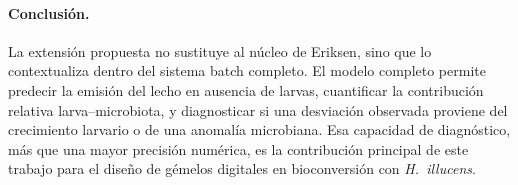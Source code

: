 \paragraph{Conclusi\'{o}n.}
La extensi\'{o}n propuesta no sustituye al n\'{u}cleo de Eriksen, sino
que lo contextualiza dentro del sistema batch completo. El modelo
completo permite predecir la emisi\'{o}n del lecho en ausencia de
larvas, cuantificar la contribuci\'{o}n relativa larva--microbiota, y
diagnosticar si una desviaci\'{o}n observada proviene del crecimiento
larvario o de una anomal\'{i}a microbiana. Esa capacidad de
diagn\'{o}stico, m\'{a}s que una mayor precisi\'{o}n num\'{e}rica, es
la contribuci\'{o}n principal de este trabajo para el dise\~{n}o de
g\'{e}melos digitales en bioconversi\'{o}n con \textit{H.~illucens}.